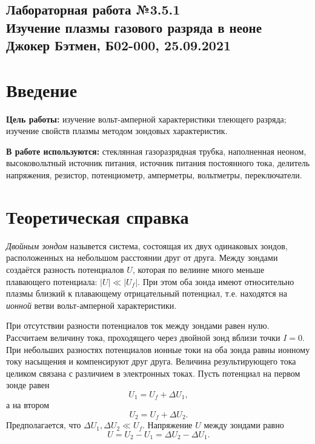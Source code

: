\documentclass[a4paper,10pt]{article}
\begin{document}
  
\begin{center}
  \section*{Лабораторная работа №3.5.1 \\Изучение плазмы газового разряда в неоне\\Джокер Бэтмен, Б02-000, 25.09.2021}
\end{center}  

\vspace{5mm}
\section*{Введение}

\begin{flushleft}
  \textbf{Цель работы:} изучение вольт-амперной характеристики тлеющего разряда; изучение свойств плазмы методом зондовых характеристик.
\end{flushleft}

\begin{flushleft}
  \textbf{В работе используются:} стеклянная газоразрядная трубка, наполненная неоном, высоковольтный источник питания, источник питания постоянного тока, делитель напряжения, резистор, потенциометр, амперметры, вольтметры, переключатели.
\end{flushleft}

\section*{Теоретическая справка}

\textit{Двойным зондом} назывется система, состоящая их двух одинаковых зондов, расположенных на небольшом расстоянии друг от друга. Между зондами создаётся разность потенциалов $U$, которая по велиине много меньше плавающего потенциала: $\left|U\right|\ll\left|U_f\right|$. При этом оба зонда имеют относительно плазмы близкий к плавающему отрицательный потенциал, т.е. находятся на \textit{ионной} ветви вольт-амперной характеристики.

При отсутствии разности потенциалов ток между зондами равен нулю. Рассчитаем величину тока, проходящего через двойной зонд вблизи точки $I=0$. При небольших разностях потенциалов ионные токи на оба зонда равны ионному току насыщения и компенсируют друг друга. Величина результирующего тока целиком связана с различием в электронных токах. Пусть потенциал на первом зонде равен\[U_1=U_f+\Delta U_1,\]а на втором\[U_2=U_f+\Delta U_2.\]Предполагается, что $\Delta U_1,\Delta U_2\ll U_f$. Напряжение $U$ между зондами равно\[U=U_2-U_1=\Delta U_2-\Delta U_1.\]
\end{document}
